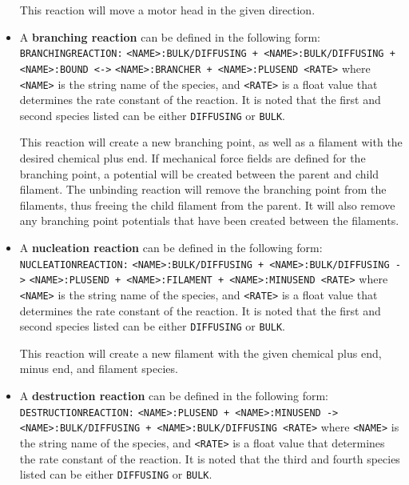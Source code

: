 \documentclass[11pt, oneside]{article}   	%
\begin{document}
\begin{itemize}
This reaction will move a motor head in the given direction.
 
\item A \textbf{branching reaction} can be defined in the following form:\newline\newline
\texttt{BRANCHINGREACTION:}\newline
\texttt{<NAME>:BULK/DIFFUSING + <NAME>:BULK/DIFFUSING +  <NAME>:BOUND <->}\newline
\texttt{<NAME>:BRANCHER + <NAME>:PLUSEND <RATE>}\newline\newline
where \texttt{<NAME>} is the string name of the species, and \texttt{<RATE>} is a float value that determines the rate constant of the reaction.  It is noted that the first and second species listed can be either \texttt{DIFFUSING} or \texttt{BULK}.

This reaction will create a new branching point, as well as a filament with the desired chemical plus end. If mechanical force fields are defined for the branching point, a potential will be created between the parent and child filament. The unbinding reaction will remove the branching point from the filaments, thus freeing the child filament from the parent. It will also remove any branching point potentials that have been created between the filaments.
 
\item A \textbf{nucleation reaction} can be defined in the following form:\newline\newline
\texttt{NUCLEATIONREACTION:}\newline
\texttt{<NAME>:BULK/DIFFUSING + <NAME>:BULK/DIFFUSING ->}\newline
\texttt{<NAME>:PLUSEND + <NAME>:FILAMENT + <NAME>:MINUSEND <RATE>}\newline\newline
where \texttt{<NAME>} is the string name of the species, and \texttt{<RATE>} is a float value that determines the rate constant of the reaction. It is noted that the first and second species listed can be either \texttt{DIFFUSING} or \texttt{BULK}.

This reaction will create a new filament with the given chemical plus end, minus end, and filament species.

\item A \textbf{destruction reaction} can be defined in the following form:\newline\newline
\texttt{DESTRUCTIONREACTION:}\newline
\texttt{<NAME>:PLUSEND + <NAME>:MINUSEND ->}\newline
\texttt{<NAME>:BULK/DIFFUSING + <NAME>:BULK/DIFFUSING <RATE>}\newline\newline
where \texttt{<NAME>} is the string name of the species, and \texttt{<RATE>} is a float value that determines the rate constant of the reaction. It is noted that the third and fourth species listed can be either \texttt{DIFFUSING} or \texttt{BULK}.


\end{itemize}
\end{document}
